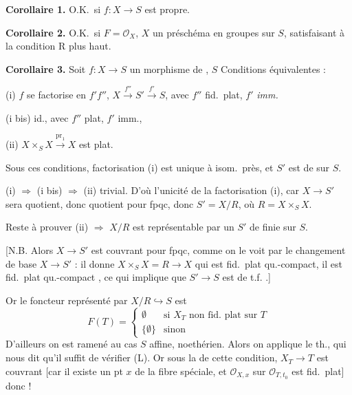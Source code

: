 \documentclass[11pt,a4paper]{article}
\begin{document}

\textbf{Corollaire 1.} O.K.\ si $f\colon X\to S$ est propre.

\textbf{Corollaire 2.} O.K.\ si  $F=\mathcal{O}_X$, $X$ un préschéma en groupes sur $S$, satisfaisant à la condition R plus haut.

\textbf{Corollaire 3.} Soit $f\colon X\to S$ un morphisme de  , $S$  Conditions équivalentes  :

(i) $f$ se factorise en $f'f''$, $X\xrightarrow{f''}S'\xrightarrow{f'}S$, avec $f''$ fid.\ plat, $f'$ \emph{imm.}

(i bis) id., avec $f''$ plat, $f'$ imm.,

(ii)  $X\times_S X\xrightarrow{\mathrm{pr}_1}X$ est plat.


Sous ces conditions,  factorisation (i) est unique à isom.\ près, et $S'$ est de   sur $S$.

(i) $\Rightarrow$ (i bis) $\Rightarrow$ (ii) trivial. D'où l'unicité de la factorisation (i), car $X\to S'$ sera quotient, donc quotient pour fpqc, donc $S'=X/R$, où $R=X\times_S X$.

Reste à prouver (ii) $\Rightarrow$  $X/R$ est représentable par un $S'$ de   finie sur $S$. 

[N.B. Alors $X\to S'$ est couvrant pour fpqc, comme on le voit par le changement de base $X\to S'$ : il donne $X\times_S X=R\to X$ qui est fid.\ plat qu.-compact, il est fid.\ plat qu.-compact \ill{}, ce qui implique  que $S'\to S$ est  de t.f. .]

Or  le foncteur représenté par $X/R\hookrightarrow S$ est  
\[
F(T)=\begin{cases}\emptyset & \text{si } X_T \text{ non fid.\ plat sur } T\\ \{\emptyset\} & \text{sinon}\end{cases}
\]
D'ailleurs on est ramené au cas $S$ affine, noethérien.  Alors on applique le th., qui nous dit qu'il suffit de vérifier  (L). Or sous la  de cette condition, $X_T\to T$ est couvrant [car il existe un pt $x$ de la fibre spéciale, et $\mathcal{O}_{X,x}$ sur $\mathcal{O}_{T,t_0}$ est fid.\ plat] donc \ill{} !
\end{document}
